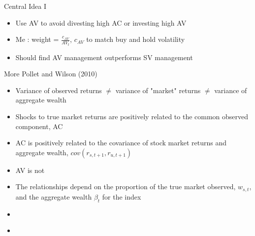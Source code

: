 \documentclass{beamer}
\begin{document}
\begin{frame}{Central Idea I}
	\begin{itemize}[<+->]
		\item Use AV to avoid divesting high AC or investing high AV
		\item Me : weight = $\frac{c_{AV}}{AV_{t}}$, $c_{AV}$ to match buy and hold volatility
		\item Should find AV management outperforms SV management
	\end{itemize}
\end{frame}

\begin{frame}{More Pollet and Wilson (2010)}
	\begin{itemize}[<+->]
		\item Variance of observed returns $\neq$ variance of "market" returns $\neq$ variance of aggregate wealth
		\item Shocks to true market returns are positively related to the common observed component, AC
		\item AC is positively related to the covariance of stock market returns and aggregate wealth,  $cov(r_{s,t+1},r_{u,t+1})$
		\item AV is not
		\item The relationships depend on the proportion of the true market observed, $w_{s,t}$, and the aggregate wealth $\beta_{t}$ for the index
		\item \hyperlink{PWII}{}
		\item \hypertarget<8>{PWreturn}{}
	\end{itemize}
\end{frame}
\end{document}

